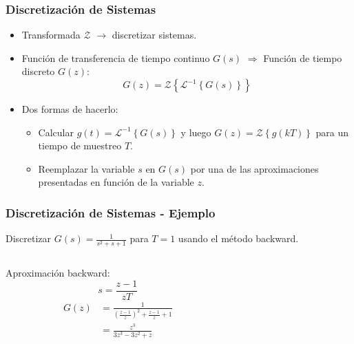 \documentclass[aspectratio=169,handout]{beamer}
\theoremstyle{definition}
\theoremstyle{plain}
\theoremstyle{remark}
\begin{document}
\begin{frame}[<+->]\frametitle{Discretización de Sistemas}
	\begin{itemize}
		\item Transformada $\mathcal{Z}$ $\rightarrow$ discretizar sistemas.
		\item Función de transferencia de tiempo continuo $G(s)$ $\Longrightarrow$ Función de tiempo discreto $G(z)$:
		\begin{equation*}
			G(z) = \mathcal{Z}\left\{ \mathcal{L}^{-1}\left\{ G(s)\right\} \right\}
		\end{equation*}
		\item Dos formas de hacerlo:
		\begin{itemize}
			\item Calcular $g(t) = \mathcal{L}^{-1}\left\{ G(s)\right\}$ y luego $G(z) = \mathcal{Z}\left\{ g(kT) \right\}$ para un tiempo de muestreo $T$.
			\item Reemplazar la variable $s$ en $G(s)$ por una de las aproximaciones presentadas en función de la variable $z$.
		\end{itemize} 
	\end{itemize}
\end{frame}

\begin{frame}[c]\frametitle{Discretización de Sistemas - Ejemplo}
	\vspace*{3mm}	
	Discretizar $G(s) = \frac{1}{s^2 + s + 1}$ para $T=1$ usando el método backward.\\
	\pause
	\vspace*{4mm}
	\begin{columns}
		\begin{column}{0.3\textwidth}
			Aproximación backward:
			\begin{equation*}
				s = \frac{z-1}{zT}
			\end{equation*}
			\pause
			\begin{align*}
				G(z) &= \frac{1}{\left(\frac{z-1}{z}\right)^2 + \frac{z-1}{z} + 1}\\
				&= \frac{z^3}{3z^3-3z^2+z}
			\end{align*}
		\end{column}
		\pause
		\begin{column}{0.7\textwidth}
			
		\end{column}
	\end{columns}
\end{frame}
\end{document}
